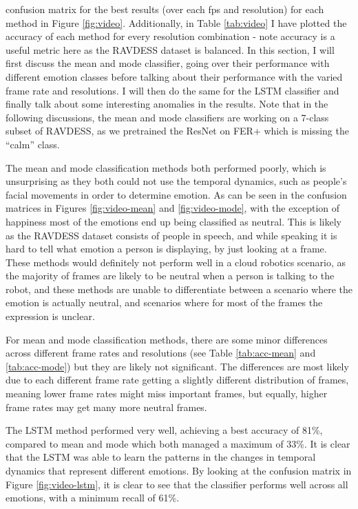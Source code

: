 \documentclass[sigconf]{acmart}
\begin{document}
{confusion matrix for the best results (over each fps and resolution) for 
each method in Figure \ref{fig:video}. Additionally, in Table \ref{tab:video}
I have plotted the accuracy of each method for every resolution combination -
note accuracy is a useful metric here as the RAVDESS dataset is balanced. In
this section, I will first discuss the mean and mode
classifier, going over their performance with different emotion classes before
talking about their performance with the varied frame rate and resolutions. I will
then do the same for the LSTM classifier and finally talk about some
interesting anomalies in the results. Note that in the following discussions,
the mean and mode classifiers are working on a 7-class subset of RAVDESS, as
we pretrained the ResNet on FER+ which is missing the ``calm'' class.

The mean and mode classification methods both performed poorly, which is
unsurprising as they both could not use the temporal dynamics, such as people's
facial movements in order to determine emotion. As can be seen in the
confusion matrices in Figures
\ref{fig:video-mean} and \ref{fig:video-mode}, with the exception of
happiness most of the emotions end up being classified as neutral. This is
likely as the RAVDESS dataset consists of people in speech, and while
speaking it is hard to tell what emotion a person is displaying, by just
looking at a frame. 
These methods would definitely not perform well in a cloud robotics scenario,
as the majority of frames are likely to be neutral when a person is
talking to the robot, and these methods are unable to differentiate
between a scenario where the emotion is actually neutral, and scenarios where
for most of the frames the expression is unclear.

For mean and mode classification methods, there are some minor differences
across different frame rates and resolutions (see Table \ref{tab:acc-mean}
and \ref{tab:acc-mode}) but they are likely not
significant. The differences are most likely due to each different frame rate
getting a slightly different distribution of frames, meaning lower frame rates
might miss important frames, but equally, higher frame rates may get many more
neutral frames. 

The LSTM method performed very well, achieving a best accuracy of 81\%,
compared to mean and mode which both managed a maximum of 33\%. It is clear
that the LSTM was able to learn the patterns in the changes in temporal
dynamics that represent different emotions. By looking at the confusion matrix
in Figure \ref{fig:video-lstm}, it is clear to  see that the classifier
performs well across all emotions, with a minimum recall of 61\%. 

}
\end{document}

